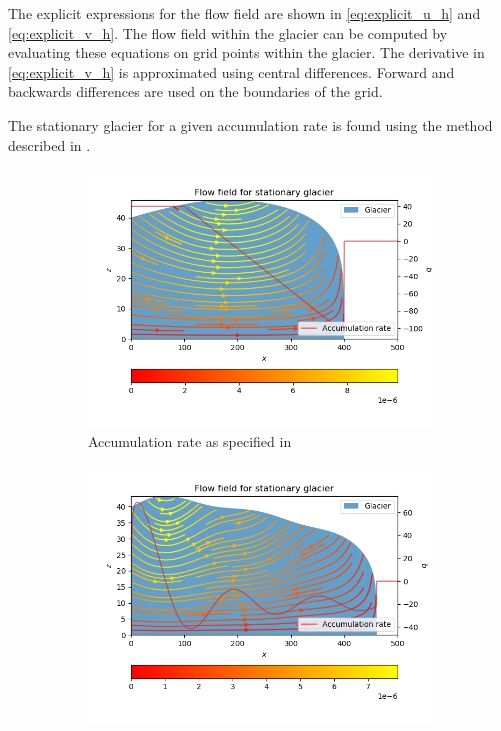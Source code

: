 The explicit expressions for the flow field are shown in \eqref{eq:explicit_u_h} and \eqref{eq:explicit_v_h}. The flow field within the glacier can be computed by evaluating these equations on grid points within the glacier. The derivative in \eqref{eq:explicit_v_h} is approximated using central differences. Forward and backwards differences are used on the boundaries of the grid.

The stationary glacier for a given accumulation rate is found using the method described in .

\begin{figure}[h]
    \centering
    \begin{subfigure}[b]{0.4\textwidth}
        \includegraphics[width=\textwidth]{report/images/flow_field_linear_production.png}
        \caption{Accumulation rate as specified in }
        \label{fig:linear}
    \end{subfigure}
    \begin{subfigure}[b]{0.4\textwidth}
        \includegraphics[width=\textwidth]{report/images/flow_field_arbitrary_production.png}

\end{subfigure}
\end{figure}
